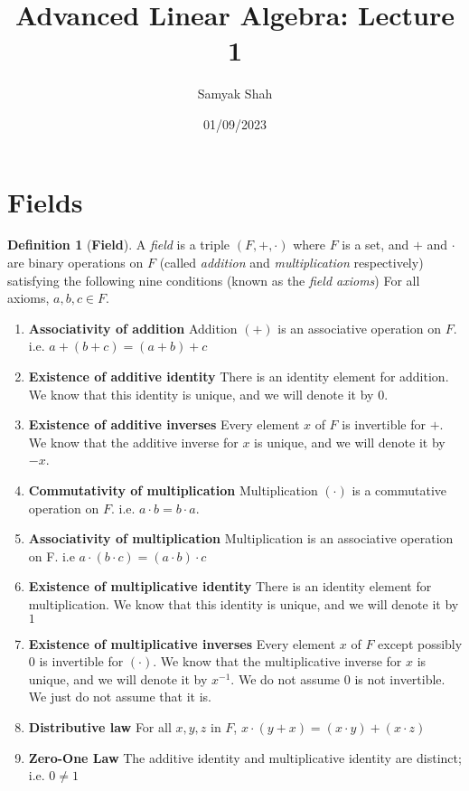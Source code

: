 \documentclass[12pt, a4paper, openany]{report}
\title{Advanced Linear Algebra: Lecture 1}
\author{Samyak Shah}
\date{01/09/2023}
\theoremstyle{definition}
\newtheorem{defn}{Definition}
\theoremstyle{remark}
\begin{document}
\maketitle

\section{Fields}

\begin{defn}[\textbf{Field}]
    A \textit{field} is a triple $(F, +, \cdot)$ where $F$ is a set, and $+$ and $\cdot$ are binary operations on $F$
    (called \textit{addition} and \textit{multiplication} respectively) satisfying the following nine conditions (known as the \textit{field axioms})
    For all axioms, $a, b, c \in F$.
\end{defn}

\begin{enumerate}
    \item \textbf{Associativity of addition} Addition $(+)$ is an associative operation on $F$. i.e. $a + (b + c) = (a + b) + c$
    \item \textbf{Existence of additive identity} There is an identity element for addition. We know that this identity is unique, and we will denote it by $0$.
    \item \textbf{Existence of additive inverses} Every element $x$ of $F$ is invertible for $+$. We know that the additive inverse for $x$ is unique, and we will denote it by $-x$.
    \item \textbf{Commutativity of multiplication} Multiplication $(\cdot)$ is a commutative operation on $F$. i.e. $a\cdot b = b \cdot a$.
    \item \textbf{Associativity of multiplication} Multiplication is an associative operation on F. i.e \(a \cdot (b \cdot c) = (a \cdot b) \cdot c\)
    \item \textbf{Existence of multiplicative identity} There is an identity element for multiplication. We know that this identity is unique, and we will denote it by \(1\)
    \item \textbf{Existence of multiplicative inverses} Every element \(x\) of \(F\) except possibly \(0\) is invertible for \((\cdot)\). We know that the multiplicative inverse for \(x\) is unique, and we will denote it by \(x^{-1}\).
          We do not assume \(0\) is not invertible. We just do not assume that it is.
    \item \textbf{Distributive law} For all \(x, y, z\) in \(F\), \(x \cdot (y + x) = (x \cdot y) + (x \cdot z)\)
    \item \textbf{Zero-One Law} The additive identity and multiplicative identity are distinct; i.e. \(0 \neq 1\)
\end{enumerate}
\end{document}
